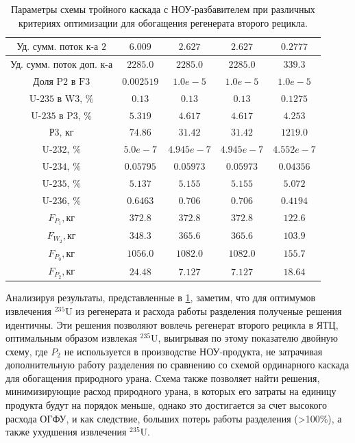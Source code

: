 \begin{table}
\begin{tabular}{ccccc}
        $\text{Уд. сумм. поток к-а 2}$ & $6.009$ & $2.627$ & $2.627$ & $0.2777$\\ \hline
        $\text{Уд. сумм. поток доп. к-а}$ & $2285.0$ & $2285.0$ & $2285.0$ & $339.3$\\ \hline
        $\text{Доля P2 в F3}$ & $0.002519$ & $1.0e-5$ & $1.0e-5$ & $1.0e-5$\\ \hline
        $\text{U-235 в W3, \%}$ & $0.13$ & $0.13$ & $0.13$ & $0.1275$\\ \hline
        $\text{U-235 в P3, \%}$ & $5.319$ & $4.617$ & $4.617$ & $4.253$\\ \hline
        $\text{Р3, кг}$ & $74.86$ & $31.42$ & $31.42$ & $1219.0$\\ \hline
        $\text{U-232, \%}$ & $5.0e-7$ & $4.945e-7$ & $4.945e-7$ & $4.552e-7$\\ \hline
        $\text{U-234, \%}$ & $0.05795$ & $0.05973$ & $0.05973$ & $0.04356$\\ \hline
        $\text{U-235, \%}$ & $5.137$ & $5.155$ & $5.155$ & $5.072$\\ \hline
        $\text{U-236, \%}$ & $0.6463$ & $0.706$ & $0.706$ & $0.4194$\\ \hline
        $F_{P_1}, \text{кг}$ & $372.8$ & $372.8$ & $372.8$ & $122.6$\\ \hline
        $F_{W_2}, \text{кг}$ & $348.3$ & $365.6$ & $365.6$ & $103.9$\\ \hline
        $F_{P_0}, \text{кг}$ & $1056.0$ & $1082.0$ & $1082.0$ & $155.7$\\ \hline
        $F_{P_2}, \text{кг}$ & $24.48$ & $7.127$ & $7.127$ & $18.64$\\ \hline
        \end{tabular}        
\caption{Параметры схемы тройного каскада с НОУ-разбавителем при различных критериях оптимизации для обогащения регенерата второго рецикла.{\label{3opt2}}}
\end{table}

Анализируя результаты, представленные в \ref{3opt2}, заметим, что для оптимумов извлечения  $^{235}$U из регенерата и расхода работы разделения полученые решения идентичны. Эти решения позволяют вовлечь регенерат второго рецикла в ЯТЦ, оптимальным образом извлекая  $^{235}$U, выигрывая по этому показателю двойную схему, где $P_2$ не используется в производстве НОУ-продукта, не затрачивая дополнительную работу разделения по сравнению со схемой ординарного каскада для обогащения природного урана.
Схема также позволяет найти решения, минимизирующие расход природного урана, в которых его затраты на единицу продукта будут на порядок меньше, однако это достигается за счет высокого расхода ОГФУ, и как следствие, больших потерь работы разделения (>100\%), а также ухудшения извлечения  $^{235}$U. 

